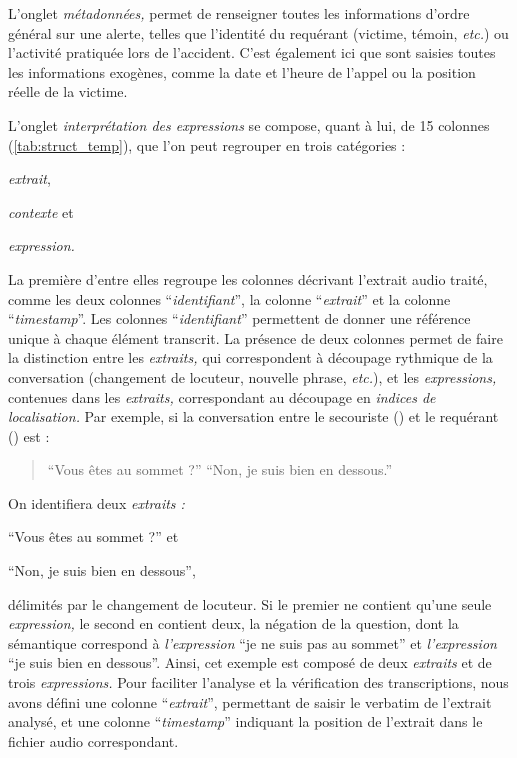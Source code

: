 L'onglet \emph{métadonnées,} permet de renseigner toutes les
informations d'ordre général sur une alerte, telles que l'identité du
requérant (victime, témoin, \emph{etc.}) ou l’activité pratiquée lors
de l'accident. C'est également ici que sont saisies toutes les
informations exogènes, comme la date et l'heure de l'appel ou la
position réelle de la victime.

L'onglet \emph{interprétation
  des expressions} se compose, quant à lui, de 15 colonnes
(\autoref{tab:struct_temp}), que l'on peut regrouper en trois
catégories :
%
\begin{enumerate*}[label=(\alph*)]
\item \emph{extrait},
\item \emph{contexte} et
\item \emph{expression.}
\end{enumerate*}

La première d'entre elles regroupe les colonnes décrivant l'extrait
audio traité, comme les deux colonnes \enquote{\emph{identifiant}}, la
colonne \enquote{\emph{extrait}} et la colonne
\enquote{\emph{timestamp}}. Les colonnes \enquote{\emph{identifiant}}
permettent de donner une référence unique à chaque élément
transcrit. La présence de deux colonnes permet de faire la distinction
entre les \emph{extraits,} qui correspondent à découpage rythmique de
la conversation (changement de locuteur, nouvelle phrase,
\emph{etc.}), et les \emph{expressions,} contenues dans les
\emph{extraits,} correspondant au découpage en \emph{indices de
  localisation.} Par exemple, si la conversation entre le secouriste
() et le requérant () est :
%
\begin{quote}
  \begin{dialogue}
    \Sec \enquote{Vous êtes au sommet ?}
    \Req \enquote{Non, je suis bien en dessous.}
  \end{dialogue}
\end{quote}
%
On identifiera deux \emph{extraits :}
%
\begin{enumerate*}[label=(\alph*)]
\item \enquote{Vous êtes au sommet ?} et
\item \enquote{Non, je suis bien en dessous},
\end{enumerate*}
%
délimités par le changement de locuteur. Si le premier ne contient
qu'une seule \emph{expression,} le second en contient deux, la
négation de la question, dont la sémantique correspond à
\emph{l'expression} \enquote{je ne suis pas au sommet} et
\emph{l'expression} \enquote{je suis bien en dessous}. Ainsi, cet
exemple est composé de deux \emph{extraits} et de trois
\emph{expressions.} Pour faciliter l'analyse et la vérification des
transcriptions, nous avons défini une colonne
\enquote{\emph{extrait}}, permettant de saisir le verbatim de
l'extrait analysé, et une colonne \enquote{\emph{timestamp}} indiquant
la position de l'extrait dans le fichier audio correspondant.

